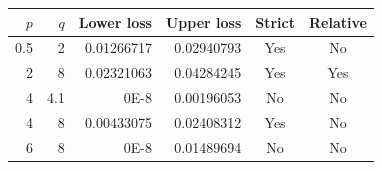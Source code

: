 \begin{tabular}{rrrrcc}
\toprule
$p$ & $q$ & Lower loss & Upper loss & Strict & Relative \\
\midrule
0.5 & 2 & 0.01266717 & 0.02940793 & Yes & No \\
2 & 8 & 0.02321063 & 0.04284245 & Yes & Yes \\
4 & 4.1 & 0E-8 & 0.00196053 & No & No \\
4 & 8 & 0.00433075 & 0.02408312 & Yes & No \\
6 & 8 & 0E-8 & 0.01489694 & No & No \\
\bottomrule
\end{tabular}
